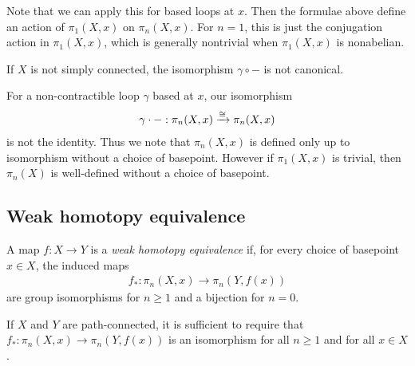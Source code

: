 \documentclass{article}[11pt]
\begin{document}
\begin{note} Note that we can apply this for based loops at $x$. Then the formulae above define an action of $\pi_1(X,x)$ on $\pi_n(X,x)$. For $n=1$, this is just the conjugation action in $\pi_1(X,x)$, which is generally nontrivial when $\pi_1(X,x)$ is nonabelian.
\end{note}

\begin{note} If $X$ is not simply connected, the isomorphism $\gamma\circ -$ is not canonical.
\end{note}

\begin{note} For a non-contractible loop $\gamma$ based at $x$, our isomorphism
\begin{align*}
	\gamma\cdot- : \pi_n(X,x) \xrightarrow{\cong} \pi_n(X,x)
\end{align*}
is not the identity. Thus we note that $\pi_n(X,x)$ is defined only up to isomorphism without a choice of basepoint. However if $\pi_1(X,x)$ is trivial, then $\pi_n(X)$ is well-defined without a choice of basepoint.
\end{note}

\subsection{Weak homotopy equivalence}

\begin{definition} A map $f: X\to Y$ is a \textit{weak homotopy equivalence} if, for every choice of basepoint $x \in X$, the induced maps
\begin{align*}
	f_\ast : \pi_n(X,x) \to \pi_n(Y,f(x))
\end{align*}
are group isomorphisms for $n\geq 1$ and a bijection for $n=0$.
\end{definition}

\begin{note} If $X$ and $Y$ are path-connected, it is sufficient to require that $f_\ast : \pi_n(X,x) \to \pi_n(Y,f(x))$ is an isomorphism for all $n\geq 1$ and for all $x\in X$.
\end{note}
\end{document}
